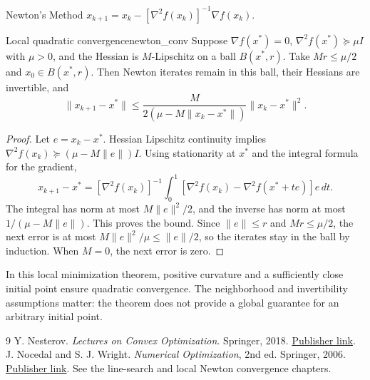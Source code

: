 \documentclass[11pt]{article}
\begin{document}
\begin{algobox}{Newton's Method}
    $x_{k+1} = x_k - [\nabla^2 f(x_k)]^{-1} \nabla f(x_k)$.
\end{algobox}

\begin{theorem}{Local quadratic convergence}{newton_conv}
Suppose $\nabla f(x^*)=0$, $\nabla^2f(x^*)\succeq\mu I$ with $\mu>0$, and the Hessian is $M$-Lipschitz on a ball $B(x^*,r)$. Take $Mr\le\mu/2$ and $x_0\in B(x^*,r)$. Then Newton iterates remain in this ball, their Hessians are invertible, and
\[
\|x_{k+1}-x^*\|
\le\frac{M}{2(\mu-M\|x_k-x^*\|)}\|x_k-x^*\|^2.
\]
\end{theorem}
\begin{proof}
Let $e=x_k-x^*$. Hessian Lipschitz continuity implies
$\nabla^2f(x_k)\succeq(\mu-M\|e\|)I$. Using stationarity at $x^*$ and the integral formula for the gradient,
\[
x_{k+1}-x^*
=[\nabla^2 f(x_k)]^{-1}
\int_0^1[\nabla^2f(x_k)-\nabla^2f(x^*+te)]e\,dt.
\]
The integral has norm at most $M\|e\|^2/2$, and the inverse has norm at most $1/(\mu-M\|e\|)$. This proves the bound. Since $\|e\|\le r$ and $Mr\le\mu/2$, the next error is at most $M\|e\|^2/\mu\le\|e\|/2$, so the iterates stay in the ball by induction. When $M=0$, the next error is zero.
\end{proof}

\begin{interpretation}
In this local minimization theorem, positive curvature and a sufficiently close initial point ensure quadratic convergence. The neighborhood and invertibility assumptions matter: the theorem does not provide a global guarantee for an arbitrary initial point.
\end{interpretation}

\begin{thebibliography}{9}
 Y. Nesterov. \textit{Lectures on Convex Optimization}. Springer, 2018. \href{https://doi.org/10.1007/978-3-319-91578-4}{Publisher link}.
 J. Nocedal and S. J. Wright. \textit{Numerical Optimization}, 2nd ed. Springer, 2006. \href{https://doi.org/10.1007/978-0-387-40065-5}{Publisher link}. See the line-search and local Newton convergence chapters.
\end{thebibliography}
\end{document}
